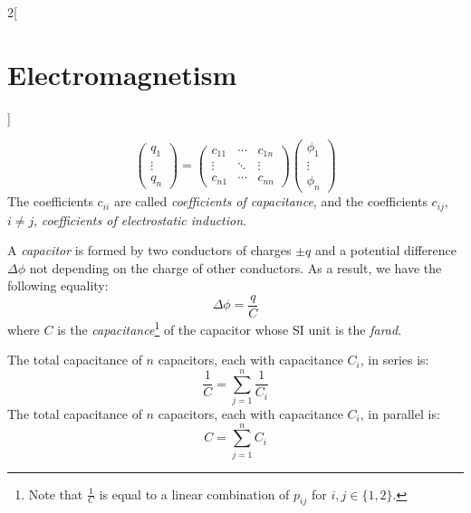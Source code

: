 \documentclass[../../../main.tex]{subfiles}
\begin{document}
\begin{multicols}{2}[\section{Electromagnetism}]
\begin{definition}
    $$
      \begin{pmatrix}
        q_1    \\
        \vdots \\
        q_n
      \end{pmatrix}=
      \begin{pmatrix}
        c_{11} & \cdots & c_{1n} \\
        \vdots & \ddots & \vdots \\
        c_{n1} & \cdots & c_{nn}
      \end{pmatrix}
      \begin{pmatrix}
        \phi_1 \\
        \vdots \\
        \phi_n
      \end{pmatrix}
    $$
    The coefficients $c_{ii}$ are called \emph{coefficients of capacitance}, and the coefficients $c_{ij}$, $i\ne j$, \emph{coefficients of electrostatic induction}.
  \end{definition}
  \begin{definition}[Capacitor]
    A \emph{capacitor} is formed by two conductors of charges $\pm q$ and a potential difference $\Delta\phi$ not depending on the charge of other conductors. As a result, we have the following equality: $$\Delta\phi=\frac{q}{C}$$ where $C$ is the \emph{capacitance}\footnote{Note that $\frac{1}{C}$ is equal to a linear combination of $p_{ij}$ for $i,j\in\{1,2\}$.} of the capacitor whose SI unit is the \emph{farad}.
  \end{definition}
  \begin{proposition}
    The total capacitance of $n$ capacitors, each with capacitance $C_i$, in series is: $$\frac{1}{C}=\sum_{j=1}^n\frac{1}{C_i}$$
    The total capacitance of $n$ capacitors, each with capacitance $C_i$, in parallel is: $$C=\sum_{j=1}^nC_i$$
  \end{proposition}

\end{multicols}
\end{document}
